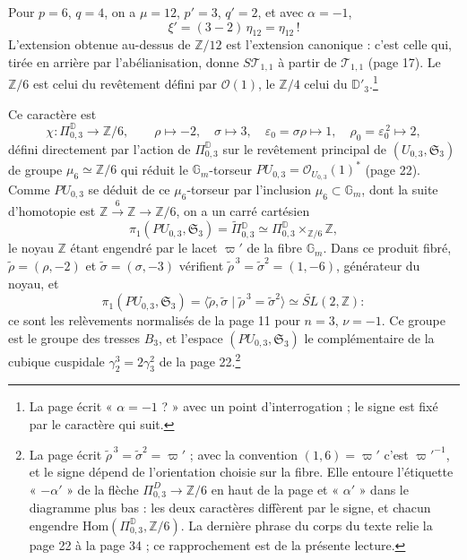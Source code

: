 \documentclass[11pt,a4paper]{article}
\begin{document}
Pour $p = 6$, $q = 4$, on a $\mu = 12$, $p' = 3$, $q' = 2$, et avec $\alpha = -1$,
\[
\xi' = (3 - 2)\,\eta_{12} = \eta_{12} \,!
\]
L'extension obtenue au-dessus de $\mathbb{Z}/12$ est l'extension canonique : c'est
celle qui, tirée en arrière par l'abélianisation, donne $S\mathcal{T}_{1,1}$ à
partir de $\mathcal{T}_{1,1}$ (page 17). Le $\mathbb{Z}/6$ est celui du revêtement
défini par $\mathcal{O}(1)$, le $\mathbb{Z}/4$ celui du $\mathbb{D}'_3$.\footnote{La
page écrit « $\alpha = -1$ ? » avec un point d'interrogation ; le signe est
fixé par le caractère qui suit.}

Ce caractère est
\[
\chi : \Pi^{\mathbb{D}}_{0,3} \longrightarrow \mathbb{Z}/6, \qquad
\rho \mapsto -2, \quad \sigma \mapsto 3, \quad \varepsilon_0 = \sigma\rho \mapsto 1,
\quad \rho_0 = \varepsilon_0^{\,2} \mapsto 2 ,
\]
défini directement par l'action de $\Pi^{\mathbb{D}}_{0,3}$ sur le revêtement
principal de $(U_{0,3}, \mathfrak{S}_3)$ de groupe $\mu_6 \simeq \mathbb{Z}/6$ qui
réduit le $\mathbb{G}_m$-torseur $PU_{0,3} = \mathcal{O}_{U_{0,3}}(1)^{*}$ (page 22).
Comme $PU_{0,3}$ se déduit de ce $\mu_6$-torseur par l'inclusion
$\mu_6 \subset \mathbb{G}_m$, dont la suite d'homotopie est
$\mathbb{Z} \xrightarrow{6} \mathbb{Z} \to \mathbb{Z}/6$, on a un carré cartésien
\[
\pi_1(PU_{0,3}, \mathfrak{S}_3) = \widetilde{\Pi}{}^{\mathbb{D}}_{0,3} \simeq
\Pi^{\mathbb{D}}_{0,3} \times_{\mathbb{Z}/6} \mathbb{Z} ,
\]
le noyau $\mathbb{Z}$ étant engendré par le lacet $\varpi'$ de la fibre
$\mathbb{G}_m$. Dans ce produit fibré, $\tilde\rho = (\rho, -2)$ et
$\tilde\sigma = (\sigma, -3)$ vérifient $\tilde\rho^{\,3} = \tilde\sigma^2 = (1, -6)$,
générateur du noyau, et
\[
\pi_1(PU_{0,3}, \mathfrak{S}_3) = \langle \tilde\rho, \tilde\sigma \mid
\tilde\rho^{\,3} = \tilde\sigma^2 \rangle \simeq \widetilde{SL}(2, \mathbb{Z}) :
\]
ce sont les relèvements normalisés de la page 11 pour $n = 3$, $\nu = -1$. Ce
groupe est le groupe des tresses $B_3$, et l'espace
$(PU_{0,3}, \mathfrak{S}_3)$ le complémentaire de la cubique cuspidale
$\gamma_2^3 = 2\gamma_3^2$ de la page 22.\footnote{La page écrit
$\tilde\rho^{\,3} = \tilde\sigma^2 = \varpi'$ ; avec la convention
$(1, 6) = \varpi'$ c'est $\varpi'^{-1}$, et le signe dépend de l'orientation
choisie sur la fibre. Elle entoure l'étiquette « $-\alpha'$ » de la flèche
$\Pi^{D}_{0,3} \to \mathbb{Z}/6$ en haut de la page et « $\alpha'$ » dans le
diagramme plus bas : les deux caractères diffèrent par le signe, et chacun
engendre $\mathrm{Hom}(\Pi^{\mathbb{D}}_{0,3}, \mathbb{Z}/6)$. La
dernière phrase du corps du texte relie la page 22 à la page 34 ; ce
rapprochement est de la présente lecture.}
\end{document}
